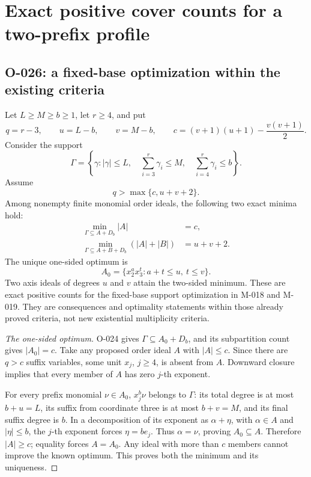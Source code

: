 \section{Exact positive cover counts for a two-prefix profile}

\subsection{O-026: a fixed-base optimization within the existing criteria}
Let $L\geq M\geq b\geq1$, let $r\geq4$, and put
\[
 q=r-3,\qquad u=L-b,\qquad v=M-b,\qquad
 c=(v+1)(u+1)-\frac{v(v+1)}2.
\]
Consider the support
\[
 \Gamma=\left\{\gamma:
       |\gamma|\leq L,\quad
       \sum_{i=3}^r\gamma_i\leq M,\quad
       \sum_{i=4}^r\gamma_i\leq b\right\}.
                                                               \tag{O-026.1}
\]
Assume
\[
                             q>\max\{c,u+v+2\}.
                                                               \tag{O-026.2}
\]
Among nonempty finite monomial order ideals, the following
two exact minima hold:
\[
 \begin{split}
 \min_{\Gamma\subseteq A+D_b}|A|&=c,\\
 \min_{\Gamma\subseteq A+B+D_b}(|A|+|B|)&=u+v+2.
 \end{split}                                                  \tag{O-026.3}
\]
The unique one-sided optimum is
\[
                  A_0=\{x_2^a x_3^t:a+t\leq u,\ t\leq v\}.
                                                               \tag{O-026.4}
\]
Two axis ideals of degrees $u$ and $v$ attain the
two-sided minimum. These are exact positive counts for
the fixed-base support optimization in M-018 and M-019.
They are consequences and optimality statements within
those already proved criteria, not new existential
multiplicity criteria.

\begin{proof}[The one-sided optimum]
O-024 gives $\Gamma\subseteq A_0+D_b$, and its
subpartition count gives $|A_0|=c$.
Take any proposed order ideal $A$ with $|A|\leq c$.
Since there are $q>c$ suffix variables, some unit
$x_j$, $j\geq4$, is absent from $A$.
Downward closure implies that every member of $A$
has zero $j$-th exponent.

For every prefix monomial $\nu\in A_0$,
$x_j^b\nu$ belongs to $\Gamma$:
its total degree is at most $b+u=L$, its suffix from
coordinate three is at most $b+v=M$, and its final
suffix degree is $b$. In a decomposition of its exponent
as $\alpha+\eta$, with $\alpha\in A$ and $|\eta|\leq b$,
the $j$-th exponent forces $\eta=be_j$.
Thus $\alpha=\nu$, proving $A_0\subseteq A$.
Therefore $|A|\geq c$; equality forces $A=A_0$.
Any ideal with more than $c$ members cannot improve
the known optimum. This proves both the minimum and
its uniqueness.
\end{proof}

